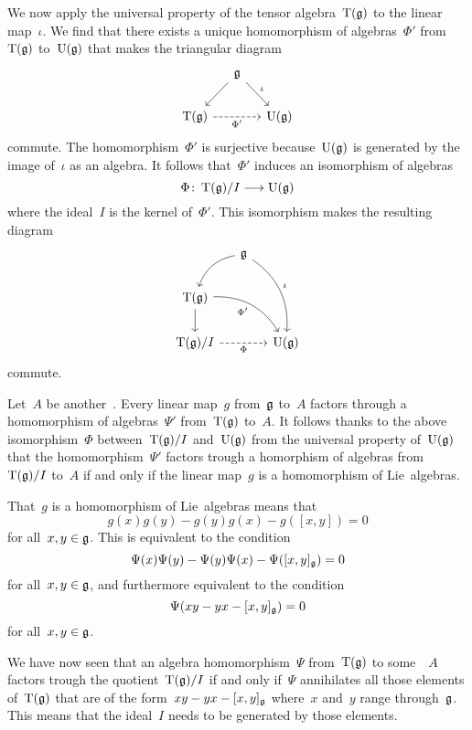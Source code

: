 \begin{fluff}
	We now apply the universal property of the tensor algebra~$\operatorname{T}(\mathfrak{g})$ to the linear map~$\iota$.
	We find that there exists a unique homomorphism of algebras~$\Phi'$ from~$\operatorname{T}(\mathfrak{g})$ to~$\operatorname{U}(\mathfrak{g})$ that makes the triangular diagram
	\[
		\begin{tikzcd}[column sep = small]
			{}
			&
			\glie
			\arrow{dl}
			\arrow{dr}[above right]{\iota}
			&
			{}
			\\
			\Tensor(\glie)
			\arrow[dashed]{rr}[below]{\Phi'}
			&
			{}
			&
			\Univ(\glie)
		\end{tikzcd}
	\]
	commute.
	The homomorphism~$\Phi'$ is surjective because~$\operatorname{U}(\mathfrak{g})$ is generated by the image of~$\iota$ as an algebra.
	It follows that~$\Phi'$ induces an isomorphism of algebras
	\[
		\Phi
		\colon
		\Tensor(\glie) / I
		\to
		\Univ(\glie)
	\]
	where the ideal~$I$ is the kernel of~$\Phi'$.
	This isomorphism makes the resulting diagram
	 \[
		\begin{tikzcd}[column sep = small]
			{}
			&
			\glie
			\arrow[bend right]{dl}
			\arrow[bend left]{ddr}[above right]{\iota}
			&
			{}
			\\
			\Tensor(\glie)
			\arrow[bend left]{drr}[below left]{\Phi'}
			\arrow{d}
			&
			{}
			&
			{}
			\\
			\Tensor(\glie)/I
			\arrow[dashed]{rr}[below]{\Phi}
			&
			{}
			&
			\Univ(\glie)
		\end{tikzcd}
	\]
	commute.
 
	Let~$A$ be another~\algebra{$\kf$}.
	Every linear map~$g$ from~$\mathfrak{g}$ to~$A$ factors through a homomorphism of algebras~$\Psi'$ from~$\operatorname{T}(\mathfrak{g})$ to~$A$.
	It follows thanks to the above isomorphism~$\Phi$ between~$\operatorname{T}(\mathfrak{g}) / I$ and~$\operatorname{U}(\mathfrak{g})$ from the universal property of~$\operatorname{U}(\mathfrak{g})$ that the homomorphism~$\Psi'$ factors trough a homorphism of algebras from~$\operatorname{T}(\mathfrak{g}) / I$ to~$A$ if and only if the linear map~$g$ is a homomorphism of Lie~algebras.

	That~$g$ is a homomorphism of Lie~algebras means that
	\[
		g(x) g(y) - g(y) g(x) - g([x,y]) = 0
	\]
	for all~$x, y \in \mathfrak{g}$.
	This is equivalent to the condition
	\[
		\Psi(x) \Psi(y) - \Psi(y) \Psi(x) - \Psi([x,y]_{\mathfrak{g}})
		=
		0
	\]
	for all~$x, y \in \mathfrak{g}$, and furthermore equivalent to the condition
	\[
		\Psi( xy - yx - [x,y]_{\mathfrak{g}} )
		=
		0
	\]
	for all~$x, y \in \mathfrak{g}$.

	We have now seen that an algebra homomorphism~$\Psi$ from~$\operatorname{T}(\mathfrak{g})$ to some~\algebra{$\kf$}~$A$ factors trough the quotient~$\operatorname{T}(\mathfrak{g})/I$ if and only if~$\Psi$ annihilates all those elements of~$\operatorname{T}(\mathfrak{g})$ that are of the form~$xy - yx - [x,y]_{\mathfrak{g}}$ where~$x$ and~$y$ range through~$\mathfrak{g}$.
	This means that the ideal~$I$ needs to be generated by those elements.
	

\end{fluff}

